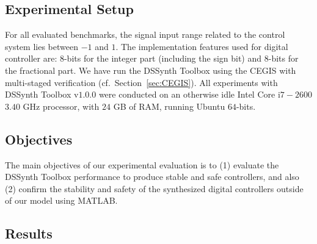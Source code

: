 \documentclass[10pt,conference]{IEEEtran}
\newcommand\tool{{DSSynth Toolbox}\xspace}
\begin{document}

\subsection{Experimental Setup}
\label{experimental-setup}

For all evaluated benchmarks, the signal input range related to the control system 
lies between $-1$ and $1$. The implementation features used for digital controller are:
$8$-bits for the integer part (including the sign bit) and $8$-bits for the fractional 
part. We have run the \tool using the CEGIS with multi-staged verification (cf.~Section~\ref{sec:CEGIS}).
All experiments with \tool v$1$.$0$.$0$  were conducted on an otherwise idle 
Intel Core i$7-2600$ $3.40$ GHz processor, with $24$ GB of RAM, running Ubuntu $64$-bits.

\subsection{Objectives}

The main objectives of our experimental evaluation is to (1) evaluate the \tool performance 
to produce stable and safe controllers, and also (2) confirm the stability and safety of the synthesized digital 
controllers outside of our model using MATLAB. %

\subsection{Results}
\end{document}
